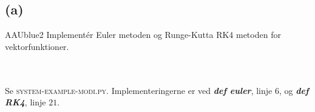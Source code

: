 \subsection*{(a) }
%
%
\begin{color}{AAUblue2}
%
Implementér Euler metoden og Runge-Kutta RK4 metoden for vektorfunktioner. 
% 
\end{color}
\\\\
% 
Se \textsc{system-example-modi.py}. Implementeringerne er ved
\textbf{\textit{def euler}}, linje $6$, og \textbf{\textit{def RK4}}, linje $21$.
%